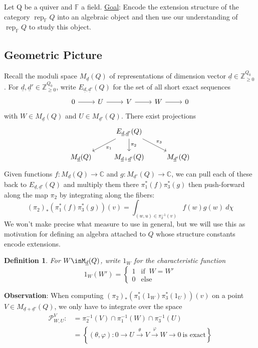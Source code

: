 \documentclass{book}
\newtheorem{definition}[theorem]{Definition}
\DeclareMathOperator{\rep}{rep}
\begin{document}
      	Let Q be a quiver and $\mathbb{F}$ a field.
 	\underline{Goal}: Encode the extension structure of the category $\rep_\mathbb{F}Q$ into an algebraic object and then use our understanding of $\rep_\mathbb{F}Q$ to study this object.
    
    	\subsection{Geometric Picture}
        	Recall the moduli space $M_{\underline{d}}(Q)$ of representations of dimension vector $\underline{d}\in \mathbb{Z}_{\geq 0}^{Q_0}$. For $\underline{d},\underline{d}'\in \mathbb{Z}_{\geq 0}^{Q_0}$, write $E_{\underline{d},\underline{d}'}(Q)$ for the set of all short exact sequences
            		\[ \begin{tikzcd}
				0 \arrow{r} & U \arrow{r} &V \arrow{r} &W \arrow{r} &0
			\end{tikzcd}\]
		with $W\in M_{\underline{d}}(Q)$ and $U\in M_{\underline{d}'}(Q)$. There exist projections
			\[ \begin{tikzcd} &\arrow{dl}{\pi_1} E_{\underline{d},\underline{d}'}(Q)\arrow{d}{\pi_2}\arrow{dr}{\pi_3}& \\
		    		M_{\underline{d}}(Q) & M_{\underline{d}+\underline{d}'}(Q) & M_{\underline{d}'}(Q)
			\end{tikzcd}\]
        	Given functions $f:M_{\underline{d}}(Q)\to \mathbb{C}$ and $g:M_{\underline{d}'}(Q)\to \mathbb{C}$, we can pull each of these back to $E_{\underline{d},\underline{d}'}(Q)$ and multiply them there $\pi_1^*(f)\pi_3^*(g)$ then push-forward along the map $\pi_2$ by integrating along the fibers:
        	\[(\pi_2)_*\left(\pi_1^*(f)\pi_3^*(g)\right)(v)=\int_{(w,u)\in \pi_2^{-1}(v)}f(w)g(w) \ d\chi\]
        	We won't make precise what measure to use in general, but we will use this as motivation for defining an algebra attached to $Q$ whose structure constants encode extensions.
    
    \begin{definition}
        For $W\inM_{\underline{d}}(Q)$, write $1_W$ for the characteristic function
        \[1_W(W') = \begin{cases} 
        1 & \text{if } \  W=W' \\
        0 & \text{else}
        \end{cases}\]
    \end{definition}
    
    \textbf{Observation}: When computing $(\pi_2)_*(\pi_1^*(1_W)\pi_3^*(1_U))(v)$ on a point $V\in M_{\underline{d}+\underline{d}'}(Q)$, we only have to integrate over the space 
    \begin{align*}
        \mathcal{P}_{W,U}^V :&= \pi_2^{-1}(V)\cap\pi_1^{-1}(W)\cap \pi_3^{-1}(U)\\
        &= \left\{ (\theta,\varphi): 
        0\to U\xrightarrow{\theta} V\xrightarrow{\varphi} W\to 0
        \ \text{is exact}\right\}
    \end{align*}
    
\end{document}
